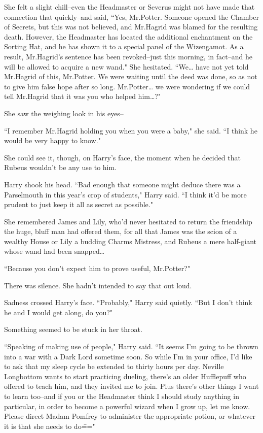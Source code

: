 She felt a slight chill\---even the Headmaster or Severus might not have made that connection that quickly\---and said, ``Yes, Mr.\?Potter. Someone opened the Chamber of Secrets, but this was not believed, and Mr.\?Hagrid was blamed for the resulting death. However, the Headmaster has located the additional enchantment on the Sorting Hat, and he has shown it to a special panel of the Wizengamot. As a result, Mr.\?Hagrid's sentence has been revoked\---just this morning, in fact\---and he will be allowed to acquire a new wand." She hesitated. ``We{\ldots} have not yet told Mr.\?Hagrid of this, Mr.\?Potter. We were waiting until the deed was done, so as not to give him false hope after so long. Mr.\?Potter{\ldots} we were wondering if we could tell Mr.\?Hagrid that it was you who helped him{\ldots}?"

She saw the weighing look in his eyes\---

``I remember Mr.\?Hagrid holding you when you were a baby," she said. ``I think he would be very happy to know."

She could see it, though, on Harry's face, the moment when he decided that Rubeus wouldn't be any use to him.

Harry shook his head. ``Bad enough that someone might deduce there was a Parselmouth in this year's crop of students," Harry said. ``I think it'd be more prudent to just keep it all as secret as possible."

She remembered James and Lily, who'd never hesitated to return the friendship the huge, bluff man had offered them, for all that James was the scion of a wealthy House or Lily a budding Charms Mistress, and Rubeus a mere half-giant whose wand had been snapped{\ldots}

``Because you don't expect him to prove useful, Mr.\?Potter?"

There was silence. She hadn't intended to say that out loud.

Sadness crossed Harry's face. ``Probably," Harry said quietly. ``But I don't think he and I would get along, do you?"

Something seemed to be stuck in her throat.

``Speaking of making use of people," Harry said. ``It seems I'm going to be thrown into a war with a Dark Lord sometime soon. So while I'm in your office, I'd like to ask that my sleep cycle be extended to thirty hours per day. Neville Longbottom wants to start practicing dueling, there's an older Hufflepuff who offered to teach him, and they invited me to join. Plus there's other things I want to learn too\---and if you or the Headmaster think I should study anything in particular, in order to become a powerful wizard when I grow up, let me know. Please direct Madam Pomfrey to administer the appropriate potion, or whatever it is that she needs to do\==="

